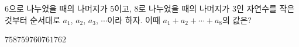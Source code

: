 $6$으로 나누었을 때의 나머지가 $5$이고, $8$로 나누었을 때의 나머지가 $3$인 자연수를 작은 것부터 순서대로 $a_1$, $a_2$, $a_3$, $\cdots$이라 하자. 이때 $a_1+a_2+\cdots+a_8$의 값은?
\begin{choices32}{$758$}{$759$}{$760$}{$761$}{$762$}\end{choices32}
